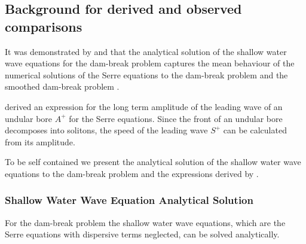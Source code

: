 \documentclass[times]{elsarticle}
\begin{document}
\subsection{Background for derived and observed comparisons}
It was demonstrated by \citet{Hank-etal-2010-2034} and \citet{Mitsotakis-etal-2014} that the analytical solution of the shallow water wave equations for the dam-break problem captures the mean behaviour of the numerical solutions of the Serre equations to the dam-break problem \cite{Hank-etal-2010-2034} and the smoothed dam-break problem \cite{Mitsotakis-etal-2014}. 

\citet{El-etal-2006} derived an expression for the long term amplitude of the leading wave of an undular bore $A^+$ for the Serre equations. Since the front of an undular bore decomposes into solitons, the speed of the leading wave $S^+$ can be calculated from its amplitude.

To be self contained we present the analytical solution of the shallow water wave equations to the dam-break problem and the expressions derived by \citet{El-etal-2006}.

\subsubsection{Shallow Water Wave Equation Analytical Solution}
For the dam-break problem the shallow water wave equations, which are the Serre equations with dispersive terms neglected, can be solved analytically. 
\end{document}
